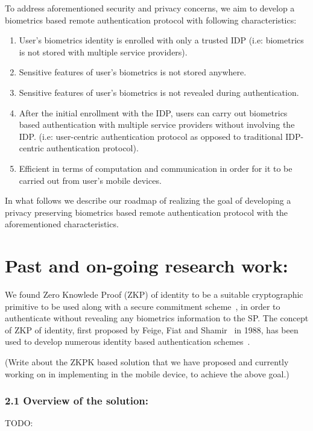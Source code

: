 \documentclass[10pt]{article}
\begin{document}
To address aforementioned security and privacy concerns, we aim to develop a biometrics based remote authentication protocol with following 
characteristics:
\begin{enumerate}
 \item User's biometrics identity is enrolled with only a trusted IDP (i.e: biometrics is not stored with multiple service providers).
 \item Sensitive features of user's biometrics is not stored anywhere.
 \item Sensitive features of user's biometrics is not revealed during authentication.
 \item After the initial enrollment with the IDP, users can carry out biometrics based authentication with multiple service providers without 
involving the IDP. (i.e: user-centric authentication protocol as opposed to traditional IDP-centric authentication protocol).
 \item Efficient in terms of computation and communication in order for it to be carried out from user's mobile devices.
\end{enumerate}

In what follows we describe our roadmap of realizing the goal of developing a privacy preserving biometrics based remote authentication protocol with 
the aforementioned characteristics.

\section{Past and on-going research work:}
We found Zero Knowlede Proof (ZKP) of identity to be a suitable cryptographic primitive to be used along with a secure commitment 
scheme~\cite{pedersenCommitment}, in order to authenticate without revealing any biometrics information to the SP. The concept of ZKP of identity, 
first proposed by Feige, Fiat and Shamir~\cite{fiat-shamir} in 1988, has been used to develop numerous identity based authentication 
schemes~\cite{idemixConcepts}.

(Write about the ZKPK based solution that we have proposed and currently working on in implementing in the mobile device, to achieve the above 
goal.)
\subsubsection*{2.1 Overview of the solution:}
TODO:
\end{document}
